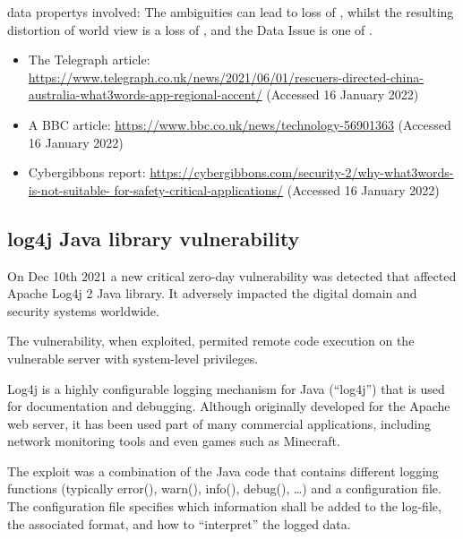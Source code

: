 \Glspl{data property} involved: The ambiguities can lead to loss of ,
whilst the resulting distortion of world view is a loss of ,
and the Data Issue is one of .

\begin{itemize}
\item The Telegraph article:
  \href{https://www.telegraph.co.uk/news/2021/06/01/rescuers-directed-china-australia-what3words-app-regional-accent/}
       {https://www.telegraph.co.uk/news/2021/06/01/rescuers-directed-china- australia-what3words-app-regional-accent/}
       (Accessed 16 January 2022)
     \item A BBC article: 
       \href{https://www.bbc.co.uk/news/technology-56901363}
            {https://www.bbc.co.uk/news/technology-56901363}
       (Accessed 16 January 2022)
          \item Cybergibbons report:
            \href{https://cybergibbons.com/security-2/why-what3words-is-not-suitable-for-safety-critical-applications/}
                 {https://cybergibbons.com/security-2/why-what3words-is-not-suitable- for-safety-critical-applications/}
       (Accessed 16 January 2022)
\end{itemize}

\subsection{log4j Java library vulnerability} \label{bkm:incacc:log4j}
On Dec 10th 2021 a new critical zero-day vulnerability was detected that affected Apache Log4j 2 Java library. 
It adversely impacted the digital domain and security systems worldwide.

The vulnerability, when exploited, permited remote code execution on the vulnerable server with system-level privileges.

Log4j is a highly configurable logging mechanism for Java (“log4j”) that is used for documentation and debugging.
Although originally developed for the Apache web server, it has been used part of many commercial applications,
including network monitoring tools and even games such as Minecraft.

The exploit was a combination of the Java code that contains different logging functions
(typically error(), warn(), info(), debug(), \dots)
and a configuration file.
The configuration file specifies which \gls{information} shall be added 
to the log-file, the associated format, and how to ``interpret'' the logged data.

